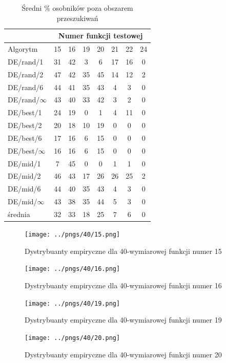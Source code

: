 \documentclass[a4paper,onecolumn,oneside,12pt,wide,floatssmall]{mwrep}
\theoremstyle{definition}
\theoremstyle{plain}%
\theoremstyle{remark}
\begin{document}
\begin{table}[H]
\centering
\begin{tabular}{ l | c | c | c | c | c | c | c }
		 & \multicolumn{7}{c}{Numer funkcji testowej}  \\  \hline
Algorytm         &15& 16& 19& 20& 21& 22& 24 \\ \hline
DE/rand/1	 & 31 & 42 & 3 & 6 & 17 & 16 & 0   \\
DE/rand/2	 & 47 & 42 & 35 & 45 & 14 & 12 & 2   \\
DE/rand/6	 & 44 & 41 & 35 & 43 & 4 & 3 & 0      \\
DE/rand/$\infty$ & 43 & 40 & 33 & 42 & 3 & 2 & 0   \\
DE/best/1	 & 24 & 19 & 0 & 1 & 4 & 11 & 0    \\
DE/best/2	 & 20 & 18 & 10 & 19 & 0 & 0 & 0    \\
DE/best/6	 & 17 & 16 & 6 & 15 & 0 & 0 & 0      \\
DE/best/$\infty$ & 16 & 16 & 6 & 15 & 0 & 0 & 0  \\
DE/mid/1         & 7 & 45 & 0 & 0 & 1 & 1 & 0  \\
DE/mid/2	 & 46 & 43 & 17 & 26 & 26 & 25 & 2   \\
DE/mid/6	 & 44 & 40 & 35 & 43 & 4 & 3 & 0     \\
DE/mid/$\infty$	 & 43 & 38 & 35 & 44 & 5 & 3 & 0    \\ \hline
średnia          & 32 & 33 & 18 & 25 & 7 & 6 & 0 \\  
\end{tabular}
\caption{Średni \% osobników poza obszarem przeszukiwań}
\end{table}

\begin{figure}[H]
\centering
\texttt{[image: ../pngs/40/15.png]}
\caption{Dystrybuanty empiryczne dla 40-wymiarowej funkcji numer 15}
\end{figure}

\begin{figure}[H]
\centering
\texttt{[image: ../pngs/40/16.png]} 
\caption{Dystrybuanty empiryczne dla 40-wymiarowej funkcji numer 16}
\end{figure}

\begin{figure}[H]
\centering
\texttt{[image: ../pngs/40/19.png]}
\caption{Dystrybuanty empiryczne dla 40-wymiarowej funkcji numer 19}
\end{figure}

\begin{figure}[H]
\centering
\texttt{[image: ../pngs/40/20.png]}
\caption{Dystrybuanty empiryczne dla 40-wymiarowej funkcji numer 20}
\end{figure}
\end{document}
